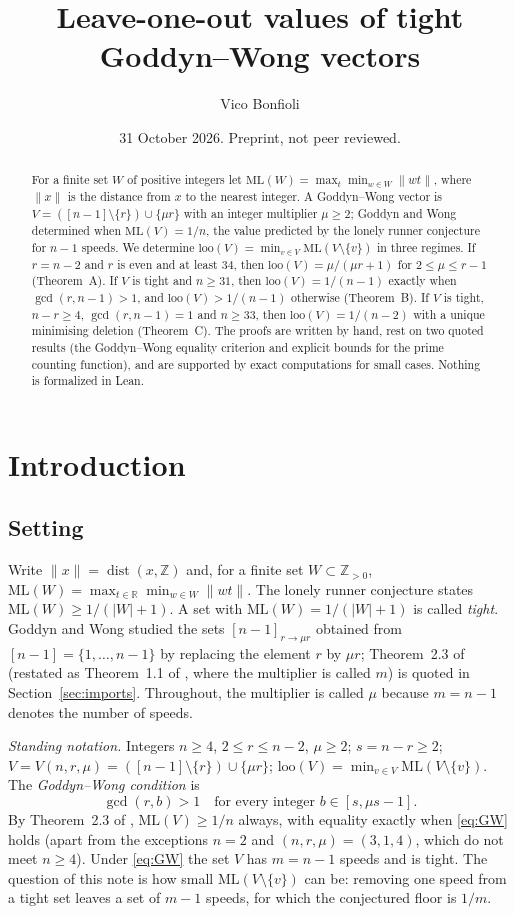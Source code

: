 \documentclass[11pt]{article}
\title{Leave-one-out values of tight Goddyn--Wong vectors}
\author{Vico Bonfioli}
\date{31 October 2026. Preprint, not peer reviewed.}
\theoremstyle{remark}
\newcommand{\norm}[1]{\lVert #1\rVert}
\newcommand{\ML}{\mathrm{ML}}
\newcommand{\loo}{\mathrm{loo}}
\newcommand{\Z}{\mathbb{Z}}
\begin{document}
\maketitle

\begin{abstract}
For a finite set $W$ of positive integers let $\ML(W)=\max_t\min_{w\in W}\norm{wt}$, where $\norm{x}$ is the distance from $x$ to the nearest integer. A Goddyn--Wong vector is $V=([n-1]\setminus\{r\})\cup\{\mu r\}$ with an integer multiplier $\mu\ge2$; Goddyn and Wong determined when $\ML(V)=1/n$, the value predicted by the lonely runner conjecture for $n-1$ speeds. We determine $\loo(V)=\min_{v\in V}\ML(V\setminus\{v\})$ in three regimes. If $r=n-2$ and $r$ is even and at least $34$, then $\loo(V)=\mu/(\mu r+1)$ for $2\le\mu\le r-1$ (Theorem~A). If $V$ is tight and $n\ge31$, then $\loo(V)=1/(n-1)$ exactly when $\gcd(r,n-1)>1$, and $\loo(V)>1/(n-1)$ otherwise (Theorem~B). If $V$ is tight, $n-r\ge4$, $\gcd(r,n-1)=1$ and $n\ge33$, then $\loo(V)=1/(n-2)$ with a unique minimising deletion (Theorem~C). The proofs are written by hand, rest on two quoted results (the Goddyn--Wong equality criterion and explicit bounds for the prime counting function), and are supported by exact computations for small cases. Nothing is formalized in Lean.
\end{abstract}

\section{Introduction}\label{sec:intro}

\subsection{Setting}
Write $\norm{x}=\operatorname{dist}(x,\Z)$ and, for a finite set $W\subset\Z_{>0}$, $\ML(W)=\max_{t\in\mathbb R}\min_{w\in W}\norm{wt}$. The lonely runner conjecture states $\ML(W)\ge1/(|W|+1)$. A set with $\ML(W)=1/(|W|+1)$ is called \emph{tight}. Goddyn and Wong \cite{GW06} studied the sets $[n-1]_{r\to\mu r}$ obtained from $[n-1]=\{1,\dots,n-1\}$ by replacing the element $r$ by $\mu r$; Theorem~2.3 of \cite{GW06} (restated as Theorem~1.1 of \cite{Zhang26}, where the multiplier is called $m$) is quoted in Section~\ref{sec:imports}. Throughout, the multiplier is called $\mu$ because $m=n-1$ denotes the number of speeds.

\emph{Standing notation.} Integers $n\ge4$, $2\le r\le n-2$, $\mu\ge2$; $s=n-r\ge2$; $V=V(n,r,\mu)=([n-1]\setminus\{r\})\cup\{\mu r\}$; $\loo(V)=\min_{v\in V}\ML(V\setminus\{v\})$. The \emph{Goddyn--Wong condition} is
\begin{equation}\tag{GW}\label{eq:GW}
\gcd(r,b)>1\quad\text{for every integer }b\in[s,\mu s-1].
\end{equation}
By Theorem~2.3 of \cite{GW06}, $\ML(V)\ge1/n$ always, with equality exactly when \eqref{eq:GW} holds (apart from the exceptions $n=2$ and $(n,r,\mu)=(3,1,4)$, which do not meet $n\ge4$). Under \eqref{eq:GW} the set $V$ has $m=n-1$ speeds and is tight. The question of this note is how small $\ML(V\setminus\{v\})$ can be: removing one speed from a tight set leaves a set of $m-1$ speeds, for which the conjectured floor is $1/m$.
\end{document}
